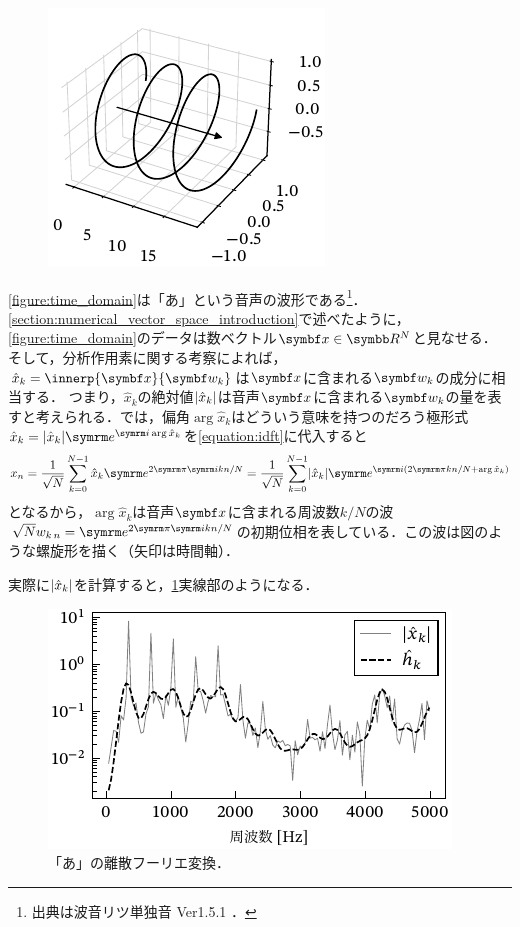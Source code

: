 \documentclass[../../main]{subfiles}
\begin{document}
\pagebreak

\begin{figure}
  \includegraphics{figures/helix.pdf}
\end{figure}

\cref{figure:time_domain}は「あ」という音声の波形である\footnote{出典は波音リツ単独音 Ver1.5.1 \cite{canon}．}．
\cref{section:numerical_vector_space_introduction}で述べたように，\cref{figure:time_domain}のデータは数ベクトル\(\vect{x}\in\numset{R}^N\)と見なせる．
そして，分析作用素に関する考察によれば，\(\hat{x}_k=\innerp{\vect{x}}{\vect{w}_k}\)は\(\vect{x}\)に含まれる\(\vect{w}_k\)の成分に相当する．
つまり，\(\hat{x}_k\)の絶対値\(\lvert\hat{x}_k\rvert\)は音声\(\vect{x}\)に含まれる\(\vect{w}_k\)の量を表すと考えられる．では，偏角\(\arg\hat{x}_k\)はどういう意味を持つのだろう\？極形式\(\hat{x}_k=\abs{\hat{x}_k}\napr^{\iuni\arg\hat{x}_k}\)を\cref{equation:idft}に代入すると
\[
  x_n = \frac{1}{\sqrt{N}}\sum_{k=0}^{N-1}\hat{x}_k\napr^{2\krez\iuni kn/N}
  = \frac{1}{\sqrt{N}}\sum_{k=0}^{N-1}\abs{\hat{x}_k}\napr^{\iuni(2\krez kn/N+\arg\hat{x}_k)}
\]
となるから，\(\arg\hat{x}_k\)は音声\(\vect{x}\)に含まれる周波数\(k/N\)の波\(\sqrt{N}\midx{w}{k}{n}=\napr^{2\krez\iuni kn/N}\)の初期位相を表している．この波は図のような螺旋形を描く（矢印は時間軸）．

実際に\(\lvert\hat{x}_k\rvert\)を計算すると，\cref{figure:frequency_domain}実線部のようになる．

\begin{figure}[htbp]
  \centering
  \includegraphics{figures/frequency_domain.pdf}
  \caption{「あ」の離散フーリエ変換．}
  \label{figure:frequency_domain}
\end{figure}
\end{document}
